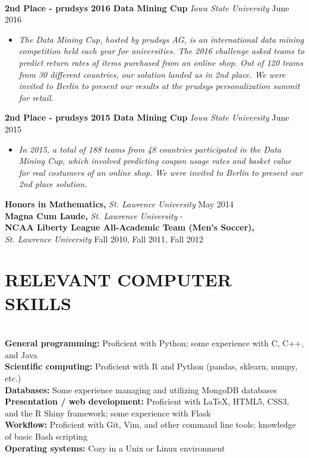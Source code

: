 \documentclass{res} %
\begin{document}
\begin{resume}
\hrulefill \\
{\bf 2nd Place - prudsys 2016 Data Mining Cup} {\sl Iowa State University} \dotfill June 2016
\begin{itemize}[label=>>]
  \item \emph{
      The Data Mining Cup, hosted by prudsys AG, is an international data mining 
      competition held each year for universities. The 2016 challenge asked teams to 
      predict return rates of items purchased from an online shop. Out of 120 teams from 30 
      different countries, our solution landed us in 2nd place. We were invited to Berlin to 
      present our results at the prudsys personalization summit for retail.
    }
\end{itemize}
{\bf 2nd Place - prudsys 2015 Data Mining Cup} {\sl Iowa State University} \dotfill June 2015 
\begin{itemize}[label=>>]
  \item \emph{
      In 2015, a total of 188 teams from 48 countries participated in the Data Mining Cup, which involved predicting coupon usage rates and basket value
      for real costumers of an online shop. We were invited to Berlin to present our 2nd place solution.
    }
\end{itemize}
\vspace{-1em}
{\bf Honors in Mathematics,} {\sl St. Lawrence University} \dotfill May 2014 \\
{\bf Magna Cum Laude,} {\sl St. Lawrence University} \hfill - \\
{\bf NCAA Liberty League All-Academic Team (Men's Soccer),} \\
{\sl St. Lawrence University} \dotfill Fall 2010, Fall 2011, Fall 2012 


\section{RELEVANT COMPUTER SKILLS}

\hrulefill \\
{\bf General programming:} Proficient with Python; some experience with C, C++, and Java \\
{\bf Scientific computing:} Proficient with R and Python (pandas, sklearn, numpy, etc.) \\
{\bf Databases:} Some experience managing and utilizing MongoDB databases \\
{\bf Presentation / web development:} Proficient with \LaTeX, HTML5, CSS3, and the R Shiny framework; some experience with Flask \\
{\bf Workflow:} Proficient with Git, Vim, and other command line tools; knowledge of basic Bash scripting \\
{\bf Operating systems:} Cozy in a Unix or Linux environment


\end{resume}
\end{document}
